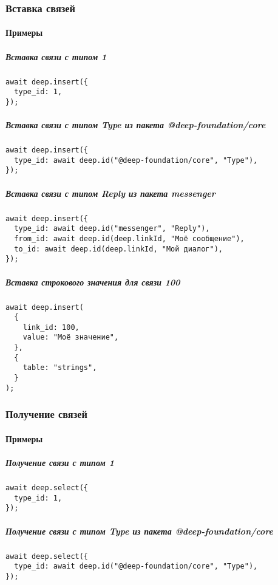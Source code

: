 \documentclass{article}
\begin{document}
\subsubsection{Вставка связей}

\paragraph{Примеры}

\subparagraph{Вставка связи с типом 1}
\begin{verbatim}
await deep.insert({
  type_id: 1,
});
\end{verbatim}

\subparagraph{Вставка связи с типом Type из пакета @deep-foundation/core}
\begin{verbatim}
await deep.insert({
  type_id: await deep.id("@deep-foundation/core", "Type"),
});
\end{verbatim}

\subparagraph{Вставка связи с типом Reply из пакета messenger}
\begin{verbatim}
await deep.insert({
  type_id: await deep.id("messenger", "Reply"),
  from_id: await deep.id(deep.linkId, "Моё сообщение"),
  to_id: await deep.id(deep.linkId, "Мой диалог"),
});
\end{verbatim}

\subparagraph{Вставка строкового значения для связи 100}
\begin{verbatim}
await deep.insert(
  {
    link_id: 100,
    value: "Моё значение",
  },
  {
    table: "strings",
  }
);
\end{verbatim}

\subsubsection{Получение связей}

\paragraph{Примеры}

\subparagraph{Получение связи с типом 1}
\begin{verbatim}
await deep.select({
  type_id: 1,
});
\end{verbatim}

\subparagraph{Получение связи с типом Type из пакета @deep-foundation/core}
\begin{verbatim}
await deep.select({
  type_id: await deep.id("@deep-foundation/core", "Type"),
});
\end{verbatim}
\end{document}
